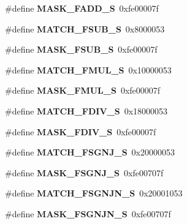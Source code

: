 \begin{DoxyCompactItemize}
\#define {\bfseries M\+A\+S\+K\+\_\+\+F\+A\+D\+D\+\_\+S}~0xfe00007f
\item 
\mbox{\label{riscv-utility_8h_af26afeaae42af6541bff8dfe85daa19f}} 
\#define {\bfseries M\+A\+T\+C\+H\+\_\+\+F\+S\+U\+B\+\_\+S}~0x8000053
\item 
\mbox{\label{riscv-utility_8h_a994e1bd494ceb68b85f89bef32e7a51a}} 
\#define {\bfseries M\+A\+S\+K\+\_\+\+F\+S\+U\+B\+\_\+S}~0xfe00007f
\item 
\mbox{\label{riscv-utility_8h_aca1b80405e9a42708ed17d5e535afb70}} 
\#define {\bfseries M\+A\+T\+C\+H\+\_\+\+F\+M\+U\+L\+\_\+S}~0x10000053
\item 
\mbox{\label{riscv-utility_8h_a76b039e4155767c86fb9ac638594019e}} 
\#define {\bfseries M\+A\+S\+K\+\_\+\+F\+M\+U\+L\+\_\+S}~0xfe00007f
\item 
\mbox{\label{riscv-utility_8h_a65a0f04b2454ae31c3abe4ad65c2fa76}} 
\#define {\bfseries M\+A\+T\+C\+H\+\_\+\+F\+D\+I\+V\+\_\+S}~0x18000053
\item 
\mbox{\label{riscv-utility_8h_a1d35869307a4c26b59281e9e07b135cd}} 
\#define {\bfseries M\+A\+S\+K\+\_\+\+F\+D\+I\+V\+\_\+S}~0xfe00007f
\item 
\mbox{\label{riscv-utility_8h_a65619a673f3fd8f8637ba1c681f7814a}} 
\#define {\bfseries M\+A\+T\+C\+H\+\_\+\+F\+S\+G\+N\+J\+\_\+S}~0x20000053
\item 
\mbox{\label{riscv-utility_8h_ac2416e864100f8b94bc980f5d0d2aaa2}} 
\#define {\bfseries M\+A\+S\+K\+\_\+\+F\+S\+G\+N\+J\+\_\+S}~0xfe00707f
\item 
\mbox{\label{riscv-utility_8h_a55d04e62dd458fcc3d259f237bc91b93}} 
\#define {\bfseries M\+A\+T\+C\+H\+\_\+\+F\+S\+G\+N\+J\+N\+\_\+S}~0x20001053
\item 
\mbox{\label{riscv-utility_8h_ab9948e1718dd908a726062cf6b7e5018}} 
\#define {\bfseries M\+A\+S\+K\+\_\+\+F\+S\+G\+N\+J\+N\+\_\+S}~0xfe00707f
\item 

\end{DoxyCompactItemize}
